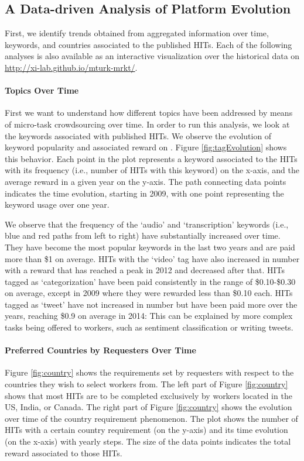\subsection{A Data-driven Analysis of Platform Evolution}
First, we identify trends obtained from aggregated information over time, keywords, and countries associated to the published HITs.  Each of the following analyses is also available as an interactive visualization over the historical data on \url{http://xi-lab.github.io/mturk-mrkt/}.
\paragraph{Topics  Over Time}
First we want to understand how different topics have been addressed by means of micro-task crowdsourcing over time.
In order to run this analysis, we look at the keywords associated with published HITs. We observe the evolution of keyword popularity and associated reward on \amt{}. 
Figure \ref{fig:tagEvolution} shows this behavior. Each point in the plot represents a keyword associated to the HITs with its frequency (i.e., number of HITs with this keyword) on the x-axis, and the average reward in a given year on the y-axis. The path connecting data points indicates the time evolution, starting in 2009, with one point representing the keyword usage over one year.

We observe that the frequency of the `audio' and `transcription' keywords (i.e., blue and red paths from left to right) have substantially increased over time. They have become the most popular keywords in the last two years and are paid more than \$1 on average.
HITs with the `video' tag have also increased in number with a reward that has reached a peak in 2012 and decreased after that.
HITs tagged as `categorization' have been paid consistently in the range of \$0.10-\$0.30 on average, except in 2009 where they were rewarded less than \$0.10 each.
HITs tagged as `tweet' have not increased in number but have been paid more over the years, reaching \$0.9 on average in 2014: This can be explained by more complex tasks being offered to workers, such as sentiment classification or writing tweets.

\paragraph{Preferred Countries by Requesters Over Time}
Figure \ref{fig:country} shows the requirements set by requesters with respect to the countries they wish to select workers from. The left part of Figure \ref{fig:country} shows that most HITs are to be completed exclusively by workers located in the US, India, or Canada. The right part of Figure \ref{fig:country} shows the evolution over time of the country requirement phenomenon.
The plot shows the number of HITs with a certain country requirement (on the y-axis) and its time evolution (on the x-axis) with yearly steps. The size of the data points indicates the total reward associated to those HITs.


